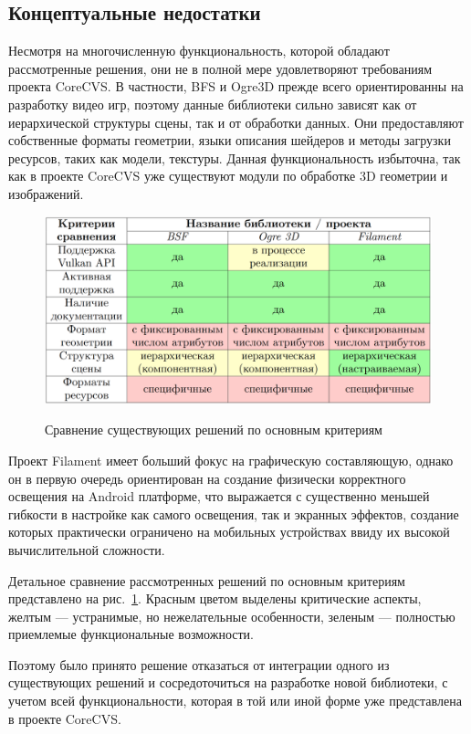 \documentclass[14pt]{matmex-diploma}
\begin{document}
\subsection{Концептуальные недостатки}

Несмотря на многочисленную функциональность, которой обладают рассмотренные решения, они не в полной мере удовлетворяют требованиям проекта CoreCVS. В частности, BFS и Ogre3D прежде всего ориентированны на разработку видео игр, поэтому данные библиотеки сильно зависят как от иерархической структуры сцены, так и от обработки данных. Они предоставляют собственные форматы геометрии, языки описания шейдеров и методы загрузки ресурсов, таких как модели, текстуры. Данная функциональность избыточна, так как в проекте CoreCVS уже существуют модули по обработке 3D геометрии и изображений. 

\begin{figure}[h]
     \caption{Сравнение существующих решений по основным критериям}
     \centering
     \includegraphics[width=1.0\textwidth]{pictures/Compare}
     \label{tab:compare:libs}
\end{figure}

Проект Filament имеет больший фокус на графическую составляющую, однако он в первую очередь ориентирован на создание физически корректного освещения на Android платформе, что выражается с существенно меньшей гибкости в настройке как самого освещения, так и экранных эффектов, создание которых практически ограничено на мобильных устройствах ввиду их высокой вычислительной сложности.

Детальное сравнение рассмотренных решений по основным критериям представлено на рис.~\ref{tab:compare:libs}. Красным цветом выделены критические аспекты, желтым --- устранимые, но нежелательные особенности, зеленым --- полностью приемлемые функциональные возможности.

Поэтому было принято решение отказаться от интеграции одного из существующих решений и сосредоточиться на разработке новой библиотеки, с учетом всей функциональности, которая в той или иной форме уже представлена в проекте CoreCVS. 
\end{document}
